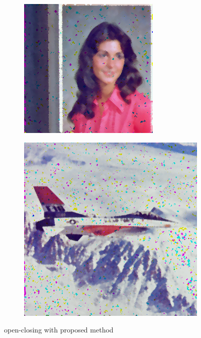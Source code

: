 \begin{subfigure}{0.9\textwidth}
\begin{subfigure}[t]{0.15\textwidth}
    \centering
  \end{subfigure}
\begin{subfigure}[t]{0.15\textwidth}
    \includegraphics[width=0.9\linewidth]{../images/outputs/denoise/oc/oc4.png}
    
    \centering
  \end{subfigure}
\begin{subfigure}[t]{0.15\textwidth}
    \includegraphics[width=0.9\linewidth]{../images/outputs/denoise/oc/oc5.png}
    
    \centering
  \end{subfigure}
 \caption{open-closing with proposed method}
 \end{subfigure}

